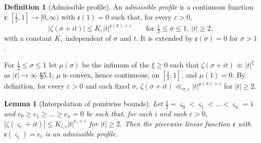 \documentclass[11pt,reqno]{amsart}
\makeatletter
\let\CG@origcite\cite
\renewcommand*{\cite}[2][]{\def\CG@citekey{#2}%
  \ifx\relax#1\relax\CG@origcite{#2}\else\CG@origcite[#1]{#2}\fi}
\numberwithin{equation}{section}
\newtheorem{lemma}[theorem]{Lemma}
\theoremstyle{definition}
\newtheorem{definition}[theorem]{Definition}
\theoremstyle{remark}
\makeatother
\begin{document}
\begin{definition}[Admissible profile]\label{def:admissible}
An \emph{admissible profile} is a continuous function $\mathfrak e\colon[\frac12,1]\to[0,\infty)$ with $\mathfrak e(1)=0$ such that, for every $\varepsilon>0$,
\begin{equation}
|\zeta(\sigma+it)|\le K_\varepsilon|t|^{\mathfrak e(\sigma)+\varepsilon}\qquad\text{for }\tfrac12\le\sigma\le1,\ |t|\ge2,
\label{eq:admissible}
\end{equation}
with a constant $K_\varepsilon$ independent of $\sigma$ and $t$. It is extended by $\mathfrak e(\sigma)=0$ for $\sigma>1$.
\end{definition}

For $\frac12\le\sigma\le1$ let $\mu(\sigma)$ be the infimum of the $\xi\ge0$ such that $\zeta(\sigma+it)\ll|t|^\xi$ as $|t|\to\infty$ \cite[\S5.1]{Titchmarsh1986}; $\mu$ is convex, hence continuous, on $[\frac12,1]$, and $\mu(1)=0$. By definition, for every $\varepsilon>0$ and each fixed $\sigma$, $\zeta(\sigma+it)\ll_{\sigma,\varepsilon}|t|^{\mu(\sigma)+\varepsilon}$ for $|t|\ge2$.

\begin{lemma}[Interpolation of pointwise bounds]\label{lem:interpolation}
Let $\frac12=\varsigma_0<\varsigma_1<\dots<\varsigma_n=1$ and $e_0\ge e_1\ge\dots\ge e_n=0$ be such that, for each $i$ and each $\varepsilon>0$, $|\zeta(\varsigma_i+it)|\le K_{i,\varepsilon}|t|^{e_i+\varepsilon}$ for $|t|\ge2$. Then the piecewise linear function $\mathfrak e$ with $\mathfrak e(\varsigma_i)=e_i$ is an admissible profile.
\end{lemma}
\end{document}
